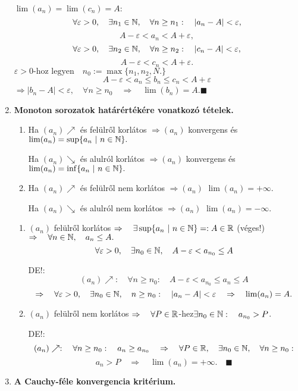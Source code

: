 \documentclass[a4paper,11.5pt]{article}
\begin{document}
\begin{enumerate}
		\biz $\lim(a_n)=\lim(c_n)=A:\quad $
		\[\forall \varepsilon>0,\quad \exists n_1\in\mathbb{N},\quad \forall n\geq n_1:\quad |a_n-A|<\varepsilon,\]
		\[ A-\varepsilon<a_n<A+\varepsilon, \]
		\[\forall \varepsilon>0,\quad \exists n_2\in\mathbb{N},\quad \forall n\geq n_2:\quad |c_n-A|<\varepsilon,\]
		\[ A-\varepsilon<c_n<A+\varepsilon. \]
		$ \varepsilon>0\text{-hoz legyen}\quad n_0:=\max\{ n_1,n_2,N. \} $
		\[ A-\varepsilon<a_n\leq b_n\leq c_n<A+\varepsilon \]
		$\Rightarrow $\quad $|b_n-A|<\varepsilon,\quad \forall n\geq n_0\quad \Rightarrow\quad \lim(b_n)=A$.\quad $\blacksquare$
		\item \textbf{Monoton sorozatok határértékére vonatkozó tételek.}
		
		\begin{enumerate}
			\item Ha $(a_n)\nearrow$ és felülről korlátos $\Rightarrow (a_n)$ konvergens és $\lim(a_n)=\sup\{a_n\ |\ n\in\mathbb{N} \}.$
			
			Ha $(a_n)\searrow$ és alulról korlátos $\Rightarrow (a_n)$ konvergens és $\lim(a_n)=\inf\{a_n\ |\ n\in\mathbb{N} \}.$
			\item Ha $(a_n)\nearrow$ és felülről nem korlátos $\Rightarrow (a_n)$ $\lim(a_n)=+\infty.$
			
			Ha $(a_n)\searrow$ és alulról nem korlátos $\Rightarrow (a_n)$ $\lim(a_n)=-\infty.$
		\end{enumerate}
		
		\biz 
		\begin{enumerate}
			\item $(a_n)$ felülről korlátos \quad $\Rightarrow\quad \exists\sup\{a_n\ |\ n\in\mathbb{N} \}=:A\in\mathbb{R}$ (véges!)\quad $\Rightarrow\quad \forall n\in\mathbb{N},\quad  a_n\leq A.$
			\[\forall \varepsilon>0,\quad  \exists n_0\in\mathbb{N},\quad A-\varepsilon<a_{n_0}\leq A\]
			
			DE!:\[ (a_n)\nearrow:\quad \forall n\geq n_0:\quad A-\varepsilon<a_{n_0}\leq a_n\leq A\]
			\[ \Rightarrow \quad \forall\varepsilon>0,\quad \exists n_0\in\mathbb{N},\quad n\geq n_0: \quad |a_n-A|<\varepsilon\quad \Rightarrow\quad \lim(a_n)=A. \]
			
			
			
			\item $(a_n)$ felülről nem korlátos \quad $\Rightarrow\quad \forall P\in\mathbb{R}$-hez\quad $\exists n_0\in\mathbb{N}:\quad a_{n_0}>P$.
			
			DE!:
			\[ (a_n)\nearrow:\quad \forall n\geq n_0:\quad a_n\geq a_{n_0}\quad \Rightarrow\quad \forall P\in\mathbb{R}, \quad \exists n_0\in\mathbb{N},\quad  \forall n\geq n_0: \]
			\[ a_n>P\quad \Rightarrow\quad \lim(a_n)=+\infty.\quad \blacksquare \]
		\end{enumerate}
		\item \textbf{A Cauchy-féle konvergencia kritérium.}
		

\end{enumerate}
\end{document}
